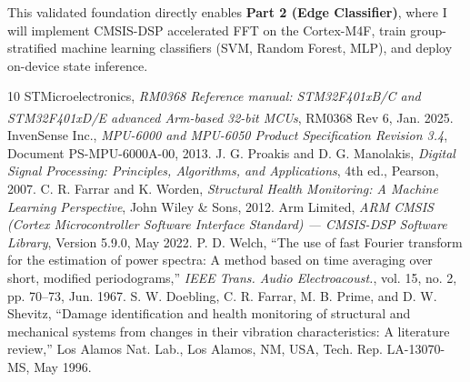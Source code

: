 \documentclass[twocolumn]{article}
\begin{document}
This validated foundation directly enables \textbf{Part 2 (Edge Classifier)}, where I will implement CMSIS-DSP accelerated FFT on the Cortex-M4F, train group-stratified machine learning classifiers (SVM, Random Forest, MLP), and deploy on-device state inference.



\vfill\pagebreak
{\fontsize{8}{9}\selectfont
\begin{thebibliography}{10}
 STMicroelectronics, \textit{RM0368 Reference manual: STM32F401xB/C and STM32F401xD/E advanced Arm\textsuperscript{\textregistered}-based 32-bit MCUs}, RM0368 Rev 6, Jan. 2025.
 InvenSense Inc., \textit{MPU-6000 and MPU-6050 Product Specification Revision 3.4}, Document PS-MPU-6000A-00, 2013.
 J. G. Proakis and D. G. Manolakis, \textit{Digital Signal Processing: Principles, Algorithms, and Applications}, 4th ed., Pearson, 2007.
 C. R. Farrar and K. Worden, \textit{Structural Health Monitoring: A Machine Learning Perspective}, John Wiley \& Sons, 2012.
 Arm Limited, \textit{ARM CMSIS (Cortex Microcontroller Software Interface Standard) --- CMSIS-DSP Software Library}, Version 5.9.0, May 2022.
 P. D. Welch, ``The use of fast Fourier transform for the estimation of power spectra: A method based on time averaging over short, modified periodograms,'' \textit{IEEE Trans. Audio Electroacoust.}, vol. 15, no. 2, pp. 70--73, Jun. 1967.
 S. W. Doebling, C. R. Farrar, M. B. Prime, and D. W. Shevitz, ``Damage identification and health monitoring of structural and mechanical systems from changes in their vibration characteristics: A literature review,'' Los Alamos Nat. Lab., Los Alamos, NM, USA, Tech. Rep. LA-13070-MS, May 1996.

\end{thebibliography}
}
\end{document}
